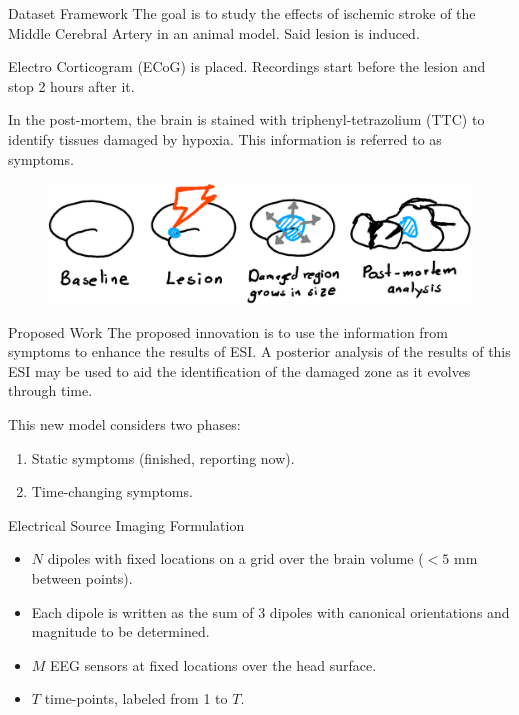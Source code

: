 \documentclass[progressbar=head]{beamer}
\begin{document}
\begin{frame}{Dataset Framework}
The goal is to study the effects of
ischemic stroke of the Middle Cerebral Artery in an animal
model. 
Said lesion is induced.

Electro Corticogram (ECoG) is placed. Recordings start before the lesion and stop 2 hours after it.

In the post-mortem, the brain is stained with
triphenyl-tetrazolium (TTC)
to identify tissues damaged by hypoxia. This information is referred to as \alert{symptoms}.

\begin{figure}
\centering
\includegraphics[width=0.8\linewidth]{./img_oldbeamer/sketch01_v2}
\end{figure}
\end{frame}

\begin{frame}{Proposed Work}
The proposed innovation is to use the information from {symptoms} to enhance the results of ESI.
%
A posterior analysis of the results of this ESI may be used to aid the identification of the damaged zone as it evolves through time.

This new model considers two phases:
\begin{enumerate}
    \item Static symptoms (finished, reporting now).
    \item Time-changing symptoms.
\end{enumerate}
\end{frame}



\begin{frame}{Electrical Source Imaging Formulation}
\begin{itemize}
    \item $N$ dipoles with fixed locations on a grid over the brain volume ($<5$ mm between points).
    \item Each dipole is written as the sum of 3 dipoles with canonical orientations and magnitude to be determined.
    \item $M$ EEG sensors at fixed locations over the head surface.
    \item $T$ time-points, labeled from 1 to $T$.
\end{itemize}
\end{frame}
\end{document}
